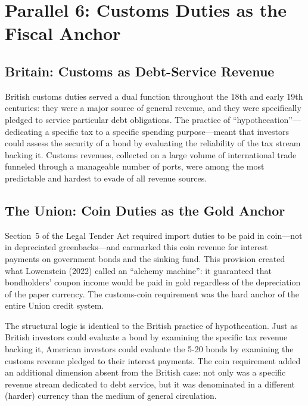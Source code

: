\documentclass[12pt]{article}
\begin{document}
\section{Parallel 6: Customs Duties as the Fiscal Anchor}
\label{sec:customs}

\subsection{Britain: Customs as Debt-Service Revenue}

British customs duties served a dual function throughout the 18th and
early 19th centuries: they were a major source of general revenue, and
they were specifically pledged to service particular debt obligations.
The practice of ``hypothecation''---dedicating a specific tax to a
specific spending purpose---meant that investors could assess the
security of a bond by evaluating the reliability of the tax stream
backing it. Customs revenues, collected on a large volume of international
trade funneled through a manageable number of ports, were among the most
predictable and hardest to evade of all revenue sources.

\subsection{The Union: Coin Duties as the Gold Anchor}

Section~5 of the Legal Tender Act required import duties to be paid in
coin---not in depreciated greenbacks---and earmarked this coin revenue
for interest payments on government bonds and the sinking fund. This
provision created what Lowenstein (2022) called an ``alchemy machine'':
it guaranteed that bondholders' coupon income would be paid in gold
regardless of the depreciation of the paper currency. The customs-coin
requirement was the hard anchor of the entire Union credit system.

The structural logic is identical to the British practice of
hypothecation. Just as British investors could evaluate a bond by
examining the specific tax revenue backing it, American investors could
evaluate the 5-20 bonds by examining the customs revenue pledged to
their interest payments. The coin requirement added an additional
dimension absent from the British case: not only was a specific revenue
stream dedicated to debt service, but it was denominated in a different
(harder) currency than the medium of general circulation.
\end{document}
